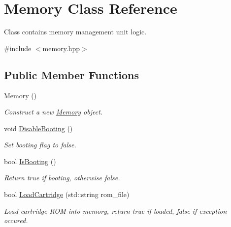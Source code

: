 \hypertarget{classMemory}{}\section{Memory Class Reference}
\label{classMemory}


Class contains memory management unit logic.  




{\ttfamily \#include $<$memory.\+hpp$>$}

\subsection*{Public Member Functions}
\begin{DoxyCompactItemize}
\item 
\mbox{\label{classMemory_a585d7bb6fc6f2237bcebf94a86b7dd99}} 
\mbox{\hyperlink{classMemory_a585d7bb6fc6f2237bcebf94a86b7dd99}{Memory}} ()
\begin{DoxyCompactList}\small\item\em Construct a new \mbox{\hyperlink{classMemory}{Memory}} object. \end{DoxyCompactList}\item 
\mbox{\label{classMemory_ae7d7eeb8e69216af894e25c93624c98f}} 
void \mbox{\hyperlink{classMemory_ae7d7eeb8e69216af894e25c93624c98f}{Disable\+Booting}} ()
\begin{DoxyCompactList}\small\item\em Set booting flag to false. \end{DoxyCompactList}\item 
bool \mbox{\hyperlink{classMemory_a39bd949ca21b0ecde1406c17cf7f3366}{Is\+Booting}} ()
\begin{DoxyCompactList}\small\item\em Return true if booting, otherwise false. \end{DoxyCompactList}\item 
bool \mbox{\hyperlink{classMemory_aa118a4c741282594d0c0d913ceac3da4}{Load\+Cartridge}} (std\+::string rom\+\_\+file)
\begin{DoxyCompactList}\small\item\em Load cartridge R\+OM into memory, return true if loaded, false if exception occured. \end{DoxyCompactList}\item 
\mbox{\label{classMemory_a84956bc02c2c6ac6b0bc88de9cb6584e}} 

\end{DoxyCompactItemize}
